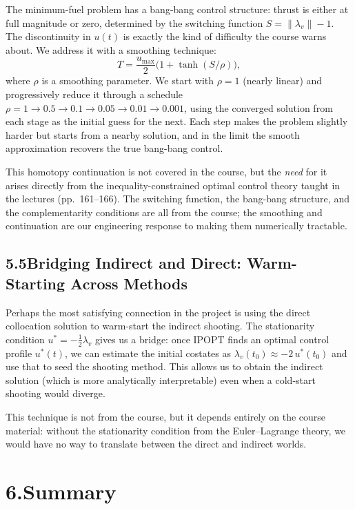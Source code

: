 \documentclass[11pt,letterpaper]{article}
\begin{document}
The minimum-fuel problem has a bang-bang control structure: thrust is either at full magnitude or zero, determined by the switching function $S = \|\lambda_v\| - 1$. The discontinuity in $u(t)$ is exactly the kind of difficulty the course warns about. We address it with a smoothing technique:
\[
  T = \frac{u_{\max}}{2}\bigl(1 + \tanh(S/\rho)\bigr),
\]
where $\rho$ is a smoothing parameter. We start with $\rho = 1$ (nearly linear) and progressively reduce it through a schedule $\rho = 1 \to 0.5 \to 0.1 \to 0.05 \to 0.01 \to 0.001$, using the converged solution from each stage as the initial guess for the next. Each step makes the problem slightly harder but starts from a nearby solution, and in the limit the smooth approximation recovers the true bang-bang control.

This homotopy continuation is not covered in the course, but the \emph{need} for it arises directly from the inequality-constrained optimal control theory taught in the lectures (pp.~161--166). The switching function, the bang-bang structure, and the complementarity conditions are all from the course; the smoothing and continuation are our engineering response to making them numerically tractable.


\subsection{5.5\quad Bridging Indirect and Direct: Warm-Starting Across Methods}

Perhaps the most satisfying connection in the project is using the direct collocation solution to warm-start the indirect shooting. The stationarity condition $u^* = -\frac{1}{2}\lambda_v$ gives us a bridge: once IPOPT finds an optimal control profile $u^*(t)$, we can estimate the initial costates as $\lambda_v(t_0) \approx -2\,u^*(t_0)$ and use that to seed the shooting method. This allows us to obtain the indirect solution (which is more analytically interpretable) even when a cold-start shooting would diverge.

This technique is not from the course, but it depends entirely on the course material: without the stationarity condition from the Euler--Lagrange theory, we would have no way to translate between the direct and indirect worlds.


\section{6.\quad Summary}
\end{document}
